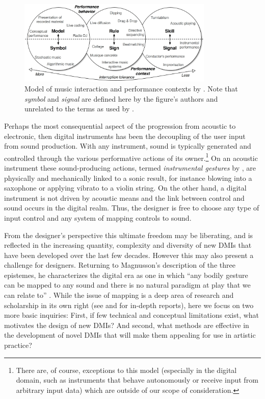 \documentclass[]{interact}
\theoremstyle{plain}%
\theoremstyle{definition}
\theoremstyle{remark}
\begin{document}
\begin{figure}[htpb]
    \centering
    \includegraphics[width=0.83\textwidth]{images/ch3_malloch_model_of_interaction.jpg}
    \caption[Model of music interaction and performance contexts]{Model of music interaction and performance contexts by \citet{Malloch2006}. Note that \emph{symbol} and \emph{signal} are defined here by the figure's authors and unrelated to the terms as used by \citet{Magnusson2019}.}
    \label{ch3-fig:malloch-model-of-interaction}
\end{figure}

Perhaps the most consequential aspect of the progression from acoustic to electronic, then digital instruments has been the decoupling of the user input from sound production. With any instrument, sound is typically generated and controlled through the various performative actions of its owner.\footnote{There are, of course, exceptions to this model (especially in the digital domain, such as instruments that behave autonomously or receive input from arbitrary input data) which are outside of our scope of consideration.} On an acoustic instrument these sound-producing actions, termed \emph{instrumental gestures} by \citet{Cadoz1988}, are physically and mechanically linked to a sonic result, for instance blowing into a saxophone or applying vibrato to a violin string. On the other hand, a digital instrument is not driven by acoustic means and the link between control and sound occurs in the digital realm. Thus, the designer is free to choose any type of input control and any system of mapping controls to sound.

From the designer's perspective this ultimate freedom may be liberating, and is reflected in the increasing quantity, complexity and diversity of new DMIs that have been developed over the last few decades. However this may also present a challenge for designers. Returning to Magnusson's description of the three epistemes, he characterizes the digital era as one in which ``any bodily gesture can be mapped to any sound and there is no natural paradigm at play that we can relate to'' \citep*[p. 34]{Magnusson2019}. While the issue of mapping is a deep area of research and scholarship in its own right (see \citet{os-mapping-2002} and \citet{cmj-mapping-2014} for in-depth reports), here we focus on two more basic inquiries: First, if few technical and conceptual limitations exist, what motivates the design of new DMIs? And second, what methods are effective in the development of novel DMIs that will make them appealing for use in artistic practice?
\end{document}
